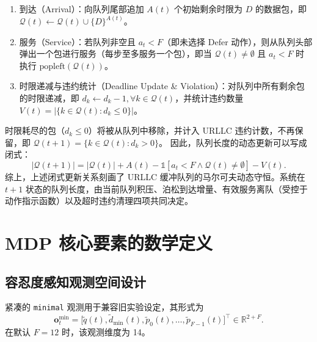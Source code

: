 \begin{enumerate}
\def\labelenumi{\arabic{enumi}.}
\item
  到达（Arrival）：向队列尾部追加 \(A(t)\) 个初始剩余时限为 \(D\) 的数据包，即 \(\mathcal{Q}(t) \leftarrow \mathcal{Q}(t) \cup \{D\}^{A(t)}\)。
\item
  服务（Service）：若队列非空且 \(a_t < F\)（即未选择 Defer 动作），则从队列头部弹出一个包进行服务（每步至多服务一个包），即当 \(\mathcal{Q}(t) \neq \emptyset\) 且 \(a_t < F\) 时执行 \(\text{popleft}(\mathcal{Q}(t))\)。
\item
  时限递减与违约统计（Deadline Update \& Violation）：对队列中所有剩余包的时限递减，即 \(d_k \leftarrow d_k - 1, \forall k \in \mathcal{Q}(t)\)，并统计违约数量 \(V(t)=\left|\{k \in \mathcal{Q}(t) : d_k \leq 0\}\right|\)。
\end{enumerate}

时限耗尽的包（\(d_k \leq 0\)）将被从队列中移除，并计入 URLLC 违约计数，不再保留，即 \(\mathcal{Q}(t+1) = \{k \in \mathcal{Q}(t) : d_k > 0\}\)。
因此，队列长度的动态更新可以写成闭式：
\begin{equation}
|\mathcal{Q}(t+1)| = |\mathcal{Q}(t)| + A(t) - \mathbb{1}[a_t < F \wedge \mathcal{Q}(t) \neq \emptyset] - V(t).
\label{eq:queue_length_update}
\end{equation}
综上，上述闭式更新关系刻画了 URLLC 缓冲队列的马尔可夫动态守恒。系统在 \(t+1\) 状态的队列长度，由当前队列积压、泊松到达增量、有效服务离队（受控于动作指示函数）以及超时违约清理四项共同决定。





\section{MDP 核心要素的数学定义}\label{33-mdp-ux6838ux5fc3ux8981ux7d20ux7684ux6570ux5b66ux5b9aux4e49}

\subsection{容忍度感知观测空间设计}\label{331-ux72b6ux6009ux7a7aux95f4-mathcals-ux4e0e-tolerance-aware-observation}

紧凑的 \texttt{minimal} 观测用于兼容旧实验设定，其形式为
\begin{equation}
\mathbf{o}^{\mathrm{min}}_t
=
\bigl[\tilde{q}(t),\tilde{d}_{\min}(t),
\tilde{p}_0(t),\ldots,\tilde{p}_{F-1}(t)\bigr]^\top
\in \mathbb{R}^{2+F}.
\label{eq:minimal_observation}
\end{equation}
在默认 \(F=12\) 时，该观测维度为 14。

